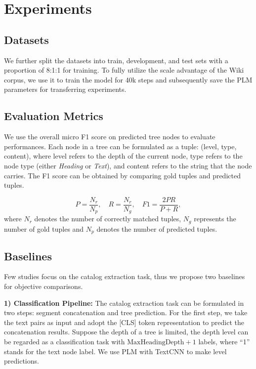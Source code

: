 \documentclass[runningheads]{llncs}
\begin{document}
 \section{Experiments}
\subsection{Datasets}
We further split the datasets into train, development, and test sets with a proportion of 8:1:1 for training.
To fully utilize the scale advantage of the Wiki corpus, we use it to train the model for 40k steps and subsequently save the PLM parameters for transferring experiments.

\subsection{Evaluation Metrics}\label{sec:exp_metrics}

We use the overall micro F1 score on predicted tree nodes to evaluate performances.
Each node in a tree can be formulated as a tuple: (level, type, content), where level refers to the depth of the current node, type refers to the node type (either \textit{Heading} or \textit{Text}), and content refers to the string that the node carries.
The F1 score can be obtained by comparing gold tuples and predicted tuples.

\begin{equation}
    \nonumber
    P = \frac{N_{r}}{N_{p}},\quad R = \frac{N_{r}}{N_{g}},\quad F1 = \frac{2PR}{P+R},
\end{equation}
where $N_{r}$ denotes the number of correctly matched tuples, $N_{g}$ represents the number of gold tuples and $N_{p}$ denotes the number of predicted tuples.

\subsection{Baselines}

Few studies focus on the catalog extraction task, thus we propose two baselines for objective comparisons.

\textbf{1) Classification Pipeline:} 
The catalog extraction task can be formulated in two steps: segment concatenation and tree prediction.
For the first step, we take the text pairs as input and adopt the [CLS] token representation to predict the concatenation results.
Suppose the depth of a tree is limited, the depth level can be regarded as a classification task with $\textrm{MaxHeadingDepth} + 1$ labels, where ``1'' stands for the text node label.
We use PLM with TextCNN \cite{textcnn} to make level predictions.
\end{document}
